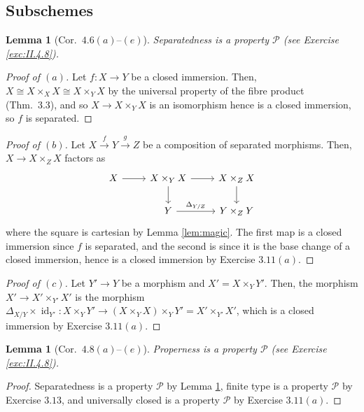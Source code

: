 \documentclass[10pt]{article}
\newtheorem{lemma}[subsubsection]{Lemma}
\theoremstyle{definition}
\theoremstyle{remark}
\numberwithin{equation}{section}
\numberwithin{figure}{subsubsection}
\DeclareMathOperator{\id}{id}
\begin{document}
\subsection{Subschemes}
\begin{lemma}[Cor.\ $4.6(a)$--$(e)$]\label{lem:psep}
  Separatedness is a property $\mathscr{P}$ (see Exercise \emph{\ref{exc:II.4.8}}).
\end{lemma}
\begin{proof}[Proof of $(a)$]
  Let $f\colon X \to Y$ be a closed immersion. Then, $X \cong X \times_X X \cong
  X \times_Y X$ by the universal property of the fibre product (Thm.~3.3), and
  so $X \to X \times_Y X$ is an isomorphism hence is a closed immersion, so $f$
  is separated. 
\end{proof}
\begin{proof}[Proof of $(b)$]
  Let $X \overset{f}{\to} Y \overset{g}{\to} Z$ be a composition of separated
  morphisms. Then, $X \to X \times_Z X$ factors as
  \begin{equation*}
    \begin{tikzcd}
      X \rar & X \times_Y X \rar\dar & X \times_Z X\dar\\
      & Y \rar{\Delta_{Y/Z}} & Y \times_Z Y
    \end{tikzcd}
  \end{equation*}
  where the square is cartesian by Lemma \ref{lem:magic}. The first map is a
  closed immersion since $f$ is separated, and the second is since it is the
  base change of a closed immersion, hence is a closed immersion by Exercise
  $3.11(a)$.
\end{proof}
\begin{proof}[Proof of $(c)$]
  Let $Y' \to Y$ be a morphism and $X' = X \times_Y Y'$. Then, the morphism $X'
  \to X' \times_{Y'} X'$ is the morphism $\Delta_{X/Y} \times \id_{Y'}\colon X
  \times_Y Y' \to (X \times_Y X) \times_Y Y' = X' \times_{Y'} X'$, which is a
  closed immersion by Exercise $3.11(a)$.
\end{proof}
\begin{lemma}[Cor.\ $4.8(a)$--$(e)$]\label{lem:pproper}
  Properness is a property $\mathscr{P}$ (see Exercise \emph{\ref{exc:II.4.8}}).
\end{lemma}
\begin{proof}
  Separatedness is a property $\mathscr{P}$ by Lemma \ref{lem:psep},
  finite type is a property $\mathscr{P}$ by Exercise $3.13$, and
  universally closed is a property $\mathscr{P}$ by Exercise $3.11(a)$.
\end{proof}
\end{document}
